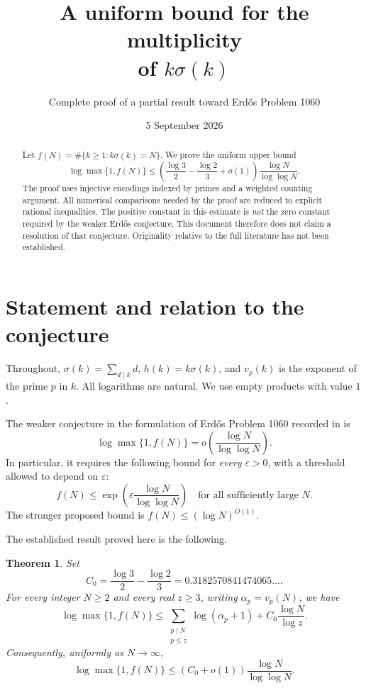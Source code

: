 \documentclass[11pt,a4paper]{article}
\title{\vspace{-1.3em}A uniform bound for the multiplicity\\of $k\sigma(k)$}
\author{Complete proof of a partial result toward Erd\H{o}s Problem 1060}
\date{5 September 2026}
\newtheorem{theorem}{Theorem}
\theoremstyle{remark}
\begin{document}
\maketitle
\thispagestyle{fancy}
\begin{abstract}
Let $f(N)=\#\{k\ge1:k\sigma(k)=N\}$. We prove the uniform upper bound
\[
\log\max\{1,f(N)\}\le
\left(\frac{\log3}{2}-\frac{\log2}{3}+o(1)\right)
\frac{\log N}{\log\log N}.
\]
The proof uses injective encodings indexed by primes and a weighted counting argument. All numerical comparisons needed by the proof are reduced to explicit rational inequalities. The positive constant in this estimate is \emph{not} the zero constant required by the weaker Erd\H{o}s conjecture. This document therefore does not claim a resolution of that conjecture. Originality relative to the full literature has not been established.
\end{abstract}

\section{Statement and relation to the conjecture}
Throughout, $\sigma(k)=\sum_{d\mid k}d$, $h(k)=k\sigma(k)$, and $v_p(k)$ is the exponent of the prime $p$ in $k$. All logarithms are natural. We use empty products with value $1$.

The weaker conjecture in the formulation of Erd\H{o}s Problem 1060 recorded in \cite{Kominers} is
\begin{equation}\label{eq:conjecture}
\log\max\{1,f(N)\}=o\!\left(\frac{\log N}{\log\log N}\right).
\end{equation}
In particular, it requires the following bound for \emph{every} $\varepsilon>0$, with a threshold allowed to depend on $\varepsilon$:
\[
f(N)\le\exp\!\left(\varepsilon\frac{\log N}{\log\log N}\right)
\quad\text{for all sufficiently large }N.
\]
The stronger proposed bound is $f(N)\le(\log N)^{O(1)}$.

The established result proved here is the following.
\begin{theorem}\label{thm:main}
Set
\[
C_0=\frac{\log3}{2}-\frac{\log2}{3}=0.3182570841474065\ldots.
\]
For every integer $N\ge2$ and every real $z\ge3$, writing $\alpha_p=v_p(N)$, we have
\begin{equation}\label{eq:finite}
\boxed{\log\max\{1,f(N)\}\le
\sum_{\substack{p\mid N\\p\le z}}\log(\alpha_p+1)
+C_0\frac{\log N}{\log z}.}
\end{equation}
Consequently, uniformly as $N\to\infty$,
\begin{equation}\label{eq:asymptotic}
\boxed{\log\max\{1,f(N)\}\le
(C_0+o(1))\frac{\log N}{\log\log N}.}
\end{equation}
\end{theorem}
\end{document}
